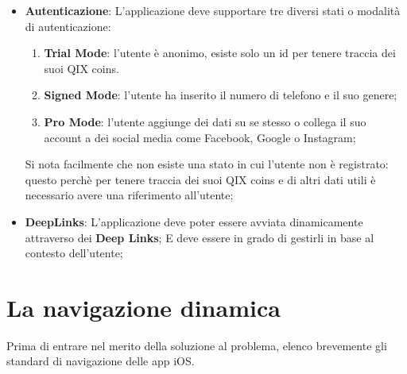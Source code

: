 \begin{itemize}
{        Tale gravità finirà con la fine dell'animazione o l'apparizione di una nuova pagina se presente;
    }
    \item {
        \textbf{Autenticazione}: L'applicazione deve supportare tre diversi stati o modalità di autenticazione:
        \begin{enumerate}
            \item\textbf{Trial Mode}: l'utente è anonimo, esiste solo un id per tenere traccia dei suoi QIX coins.
            \item\textbf{Signed Mode}: l'utente ha inserito il numero di telefono e il suo genere;
            \item \textbf{Pro Mode}: l'utente aggiunge dei dati su se stesso o collega il suo account a dei social media come Facebook, Google o Instagram;
        \end{enumerate}
        Si nota facilmente che non esiste una stato in cui l'utente non è registrato: questo perchè
        per tenere traccia dei suoi QIX coins e di altri dati utili è necessario avere una riferimento all'utente;
    }
    \item {
        \textbf{DeepLinks}: L'applicazione deve poter essere avviata dinamicamente
        attraverso dei \textbf{Deep Links}\cite{deeplinks};
        E deve essere in grado di gestirli in base al contesto dell'utente;
    }
\end{itemize}

\section{La navigazione dinamica}


Prima di entrare nel merito della soluzione al problema, elenco brevemente gli
standard di navigazione delle app iOS.

